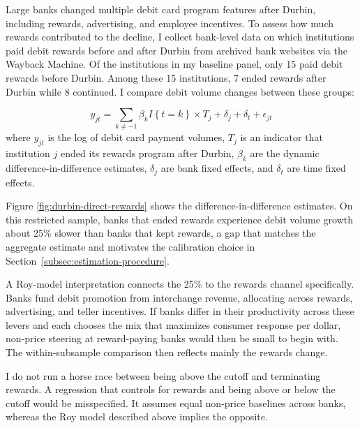 \documentclass[main.tex]{subfiles}
\begin{document}
Large banks changed multiple debit card program features after Durbin, including rewards, advertising, and employee incentives.
To assess how much rewards contributed to the decline, I collect bank-level data on which institutions paid debit rewards before and after Durbin from archived bank websites via the Wayback Machine.
Of the  institutions in my baseline panel, only 15 paid debit rewards before Durbin.
Among these 15 institutions, 7 ended rewards after Durbin
while 8 continued.
I compare debit volume changes between these groups:

\begin{equation}
    y_{jt} = \sum_{k\neq-1}\beta_k I\left\{t=k\right\} \times T_{j} + \delta_j + \delta_t + \epsilon_{jt}
\end{equation}
where $y_{jt}$ is the log of debit card payment volumes, $T_{j}$ is an indicator that institution $j$ ended its rewards program after Durbin, $\beta_k$ are the dynamic difference-in-difference estimates, $\delta_j$ are bank fixed effects, and $\delta_t$ are time fixed effects.

Figure \ref{fig:durbin-direct-rewards} shows the difference-in-difference estimates.
On this restricted sample, banks that ended rewards experience debit volume growth about 25\% slower than banks that kept rewards, a gap that matches the aggregate estimate and motivates the calibration choice in Section~\ref{subsec:estimation-procedure}.

A Roy-model interpretation connects the 25\% to the rewards channel specifically.
Banks fund debit promotion from interchange revenue, allocating across rewards, advertising, and teller incentives.
If banks differ in their productivity across these levers and each chooses the mix that maximizes consumer response per dollar, non-price steering at reward-paying banks would then be small to begin with. 
The within-subsample comparison then reflects mainly the rewards change.

I do not run a horse race between being above the cutoff and terminating rewards.
A regression that controls for rewards and being above or below the cutoff would be misspecified.
It assumes equal non-price baselines across banks, whereas the Roy model described above implies the opposite.
\end{document}
